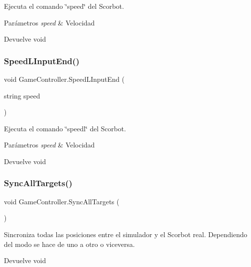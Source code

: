 Ejecuta el comando \char`\"{}speed\char`\"{} del Scorbot. 
\begin{DoxyParams}{Parámetros}
{\em speed} & Velocidad \\
\hline
\end{DoxyParams}
\begin{DoxyReturn}{Devuelve}
void 
\end{DoxyReturn}
\mbox{\label{class_game_controller_aa10e8ec20019adfd8f3c2dfbea4ff8bc}} 
\subsubsection{\texorpdfstring{SpeedLInputEnd()}{SpeedLInputEnd()}}
{\footnotesize\ttfamily void Game\+Controller.\+Speed\+L\+Input\+End (\begin{DoxyParamCaption}\item[{string}]{speed }\end{DoxyParamCaption})\hspace{0.3cm}{\ttfamily [inline]}}

Ejecuta el comando \char`\"{}speedl\char`\"{} del Scorbot. 
\begin{DoxyParams}{Parámetros}
{\em speed} & Velocidad \\
\hline
\end{DoxyParams}
\begin{DoxyReturn}{Devuelve}
void 
\end{DoxyReturn}
\mbox{\label{class_game_controller_ab42ee9c1c07fc60cb506b769bd6047c9}} 
\subsubsection{\texorpdfstring{SyncAllTargets()}{SyncAllTargets()}}
{\footnotesize\ttfamily void Game\+Controller.\+Sync\+All\+Targets (\begin{DoxyParamCaption}{ }\end{DoxyParamCaption})\hspace{0.3cm}{\ttfamily [inline]}}

Sincroniza todas las posiciones entre el simulador y el Scorbot real. Dependiendo del modo se hace de uno a otro o viceversa. \begin{DoxyReturn}{Devuelve}
void 
\end{DoxyReturn}
\mbox{\label{class_game_controller_a3e908f52a48528254dddc0f4f4a9d9f8}} 

